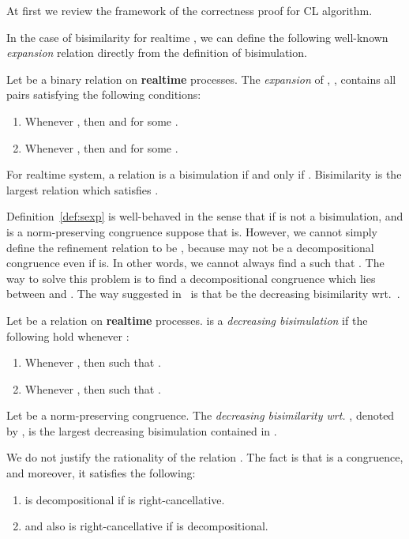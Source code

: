 \documentclass{llncs}
\begin{document}
At first we review the framework of the correctness proof for CL algorithm.

In the case of bisimilarity for realtime  , we can define the following well-known {\em expansion} relation directly from the definition of bisimulation.

 \begin{definition}\label{def:sexp}
Let  be a binary relation on \textbf{realtime} processes.
The {\em expansion} of ,  , contains all pairs
 satisfying the  following conditions:

\begin{enumerate}
\item
Whenever , then  and  for some .
\item
Whenever , then  and  for some .
\end{enumerate}
\end{definition}

For realtime system,  a relation  is a bisimulation if and only if . Bisimilarity  is the largest relation  which  satisfies .

Definition~\ref{def:sexp} is well-behaved in the sense that  if  is not a bisimulation, and  is a norm-preserving congruence suppose that  is. However, we cannot simply define the refinement relation  to be , because  may not be a decompositional congruence even if  is.  In other words, we cannot always find a  such that .  The way to solve this problem is to find a decompositional congruence   which lies between  and . The way suggested in~\cite{DBLP:journals/mscs/HirshfeldJM96} is that   be the decreasing bisimilarity wrt.~.

\begin{definition}\label{def:relative_realtime}
Let  be a relation on \textbf{realtime} processes.  is a {\em decreasing bisimulation}  if the following hold whenever :
\begin{enumerate}
\item
Whenever , then
 such that .

\item
Whenever , then
 such that .
\end{enumerate}


Let  be a norm-preserving congruence.  The {\em decreasing bisimilarity wrt. }, denoted by  , is the largest decreasing bisimulation contained in .
\end{definition}

We do not justify the rationality of the relation . The fact is  that  is a congruence, and moreover, it satisfies the following:
\begin{enumerate}
\item
 is decompositional if  is right-cancellative.

\item
 and also  is right-cancellative if  is decompositional.
\end{enumerate}
\end{document}
